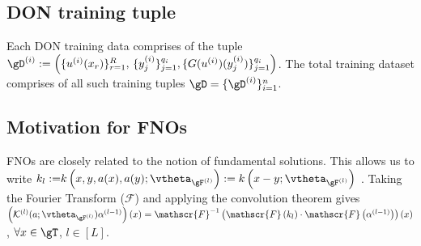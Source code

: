 
%

%
\subsection{DON training tuple}
Each DON training data comprises of the tuple $\gD^{(i)}:=\left(\{u^{(i)}(x_r)\}_{r=1}^R,\, \{y^{(i)}_j\}_{j=1}^{q_i}, \{G(u^{(i)})(y^{(i)}_j)\}_{j=1}^{q_i}\right)$. The total training dataset comprises of all such training tuples $\gD = \{ \gD^{(i)}\}_{i=1}^n$.

\subsection{Motivation for FNOs}
FNOs are closely related to the notion of fundamental solutions. This allows us to write ${k_{l}:=}k\left(x, y, a(x), a(y) ; \vtheta_{\gF^{(l)}}\right) := k\left(x-y; \vtheta_{\gF^{(l)}}\right)$ \citep{li_fourier_2021}. Taking the Fourier Transform ($\mathscr{F}$) and applying the convolution theorem gives
$\left(\mathcal{K}^{(l)}(a ;  \vtheta_{\gF^{(l)}}) \alpha^{(l-1)}\right)(x)=
\mathscr{F}^{-1}\left(\mathscr{F}\left(k_l\right) \cdot \mathscr{F}\left(\alpha^{(l-1)}\right)\right)(x)$, $\forall x \in \gT$, $l\in [L]$.

